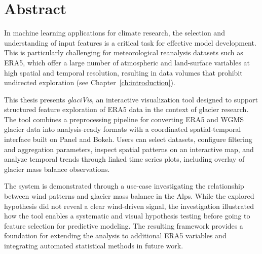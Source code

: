 
\ClearPage
{}
\chapter*{Abstract}
In machine learning applications for climate research, the selection and
understanding of input features is a critical task for effective model
development. This is particularly challenging for meteorological reanalysis datasets such as ERA5, which offer a large number of atmospheric and
land-surface variables at high spatial and temporal resolution, resulting in data volumes that prohibit undirected exploration (see Chapter~\ref{ch:introduction}).

This thesis presents \textit{glaciVis}, an interactive visualization tool designed to support structured feature exploration of ERA5 data in the context of glacier research. The tool combines a preprocessing pipeline for converting ERA5 and WGMS glacier data into analysis-ready formats with a coordinated spatial-temporal interface built on Panel and Bokeh.
Users can select datasets, configure filtering and aggregation parameters, inspect spatial patterns on an interactive map, and analyze temporal trends through linked time series plots, including overlay of glacier mass balance
observations.

The system is demonstrated through a use-case investigating the relationship between wind patterns and glacier mass balance in the Alps.
While the explored hypothesis did not reveal a clear wind-driven signal, the investigation illustrated how the tool enables a systematic and visual hypothesis testing before going to feature selection for predictive modeling.
The resulting framework provides a foundation for extending the
analysis to additional ERA5 variables and integrating automated statistical methods in future work.